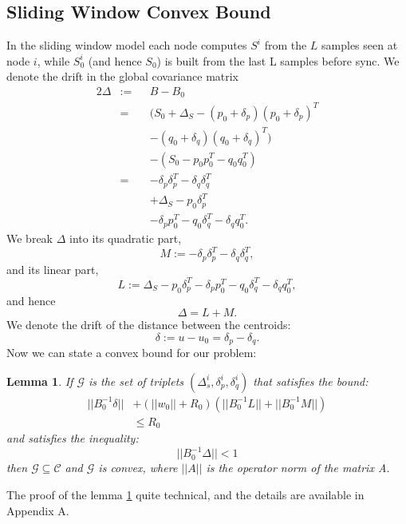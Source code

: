 \documentclass[11pt,twocolumn,varwidth=true,a4paper,fleqn]{article}
\newtheorem{lemma}{Lemma}
\begin{document}
\subsection{Sliding Window Convex Bound}
In the sliding window model each node computes $S^i$ from the $L$ samples seen
at node $i$, while $S_0^i$ (and hence $S_0$) is built from the last L samples before
sync. 
We denote the drift in the global covariance matrix
\begin{alignat*}{2}
\Delta & := && B-B_0 \\
& = && (S_0+\Delta_S - (p_0+\delta_p)(p_0+\delta_p)^T \\
& && - (q_0+\delta_q)(q_0+\delta_q)^T) \\
& && - (S_0 - p_0p_0^T - q_0q_0^T) \\
& = && - \delta_p\delta_p^T - \delta_q\delta_q^T \\
& && + \Delta_S - p_0\delta_p^T \\
& && - \delta_pp_0^T - q_0\delta_q^T - \delta_qq_0^T.
\end{alignat*}
We break $\Delta$ into its quadratic part,
\begin{equation*}
M:= - \delta_p\delta_p^T - \delta_q\delta_q^T, 
\end{equation*}
and its linear part,
\begin{equation*}
L:= \Delta_S - p_0\delta_p^T - \delta_pp_0^T - q_0\delta_q^T - \delta_qq_0^T, 
\end{equation*}
and hence 
\begin{equation*}
\Delta= L+ M.
\end{equation*}
We denote the drift of the distance between the centroids:
\begin{equation*}
\delta:= u-u_0 = \delta_p - \delta_q.
\end{equation*}
Now we can state a convex bound for our problem:
\begin{lemma} \label{convexBound}
If $\mathcal{G}$ is the set of triplets $(\Delta_s^i, \delta_p^i, \delta_q^i)$
 that satisfies the bound:
 \begin{equation} \label{eq:convexBound}
\begin{split}
||B_0^{-1}\delta|| &+ (||w_0||+R_0)(||B_0^{-1}L||+||B_0^{-1}M||) \\ & \leq  R_0
\end{split}
\end{equation}
and satisfies the inequality:
 \begin{equation*} 
||B_0^{-1}\Delta|| < 1
\end{equation*}
 then $\mathcal{G}
 \subseteq \mathcal{C}$ and $\mathcal{G}$ is convex, where $||A||$ is the
 operator norm of the matrix A.
\end{lemma}
The proof of the lemma \ref{convexBound} quite technical, and
the details are available in Appendix A.
\end{document}

